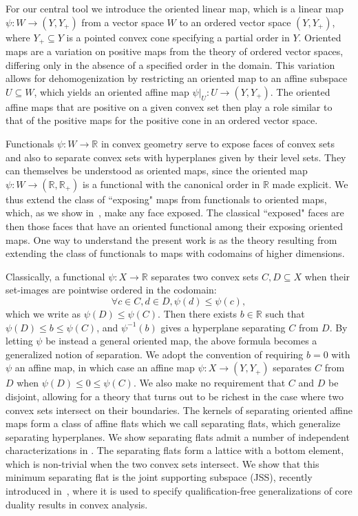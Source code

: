 \documentclass{article}
\theoremstyle{plain}
\theoremstyle{definition}
\theoremstyle{remark}
\begin{document}
For our central tool we introduce the oriented linear map, which is a linear map $\psi:W \to (Y, Y_+)$
from a vector space $W$ to an ordered vector space $(Y, Y_+)$,
where $Y_+ \subseteq Y$ is a pointed convex cone specifying a partial order in $Y$.
Oriented maps are a variation on positive maps from the theory of ordered vector
spaces, differing only in the absence of a specified order in the domain.
This variation allows for dehomogenization by restricting an oriented map to an
affine subspace $U \subseteq W$, which yields an oriented affine map $\psi|_U:U \to (Y, Y_+)$.
The oriented affine maps that are positive on a given convex set then play a role similar
to that of the positive maps for the positive cone in an ordered vector space.

Functionals $\psi:W \to \mathbb{R}$ in convex geometry serve to
expose faces of convex sets and also to separate convex sets
with hyperplanes given by their level sets.
They can themselves be understood as oriented maps, since the oriented map 
$\psi:W \to (\mathbb{R}, \mathbb{R}_+)$ is a functional with the canonical
order in $\mathbb{R}$ made explicit. 
We thus extend the class of ``exposing" maps from functionals to oriented maps,
which, as we show in~, make any face exposed. The classical
``exposed" faces are then those faces that have an oriented functional
among their exposing oriented maps. One way to understand the present work is as the theory resulting from extending the class of functionals to maps with codomains of higher dimensions.

Classically, a functional $\psi:X \to \mathbb{R}$ separates two convex sets $C, D \subseteq X$
when their set-images are pointwise ordered in the codomain:
\begin{equation*}
\forall c \in C, d \in D,  \psi(d) \le \psi(c),
\end{equation*}
which we write as $\psi(D) \le \psi(C)$. Then there exists $b \in \mathbb{R}$ such that $\psi(D) \le b \le \psi(C)$, and $\psi^{-1}(b)$ gives a
hyperplane separating $C$ from $D$.
By letting $\psi$ be instead a general oriented map, the above formula
becomes a generalized notion of separation.
We adopt the convention of requiring $b = 0$ with $\psi$ an affine map, in which case an affine
map $\psi:X \to (Y, Y_+)$ separates $C$ from $D$ when $\psi(D) \le 0 \le \psi(C)$.
We also make no requirement that $C$ and $D$ be disjoint, allowing 
for a theory that turns out to be richest in the case where two convex sets intersect on their
boundaries. The kernels of separating oriented affine maps form a class
of affine flats which we call separating flats, which generalize separating hyperplanes.
We show separating flats admit a number of independent characterizations in .
The separating flats form a lattice with a bottom element, which is non-trivial
when the two convex sets intersect.
We show that this minimum separating flat is the joint supporting subspace (JSS), recently introduced in~\cite{scottBilateralFacialReduction2026},
where it is used to specify qualification-free generalizations of core duality results in convex analysis. 
\end{document}
